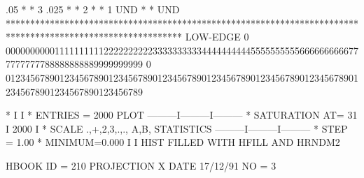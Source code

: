\begin{Listing}
      .05   *                                                                                                          *   3
      .025  *                                                                                                          *   2
            *                                                                                                          *   1
   UND      *                                                                                                          * UND
            ************************************************************************************************************
 LOW-EDGE   0   0000000000111111111122222222223333333333444444444455555555556666666666777777777788888888889999999999
            0   0123456789012345678901234567890123456789012345678901234567890123456789012345678901234567890123456789
 
  *                                                          I         I
  * ENTRIES =     2000                   PLOT       ---------I---------I---------
  * SATURATION  AT=           31                             I 2000    I
  * SCALE  .,+,2,3,.,., A,B,           STATISTICS   ---------I---------I---------
  * STEP = 1.00     * MINIMUM=0.000                          I         I
\newpage 
 HIST FILLED WITH HFILL AND HRNDM2                                               
 
 HBOOK     ID =       210             PROJECTION X               DATE  17/12/91              NO =   3
 

\end{Listing}
